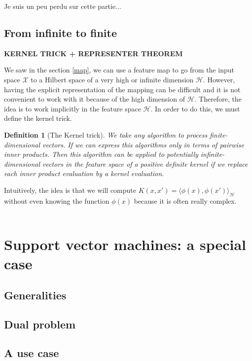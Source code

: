 \documentclass[a4paper, 11pt]{article}
\newtheorem{definition}{Definition}
\begin{document}
{\color{red} Je suis un peu perdu sur cette partie... }

\subsection{From infinite to finite}

{\bf \color{red} KERNEL TRICK + REPRESENTER THEOREM}

We saw in the section \ref{map}, we can use a feature map to go from the input space $\mathcal{X}$ to a Hilbert space of a very high or infinite dimension $\mathcal{H}$. However, having the explicit representation of the mapping can be difficult and it is not convenient to work with it because of the high dimension of $\mathcal{H}$. Therefore, the idea is to work implicitly in the feature space $\mathcal{H}$. In order to do this, we must define the kernel trick.

\begin{definition} [The Kernel trick]
We take any algorithm to process finite-dimensional vectors. If we can express this algorithms only in terms of pairwise inner products. Then this algorithm can be applied to potentially infinite-dimensional vectors in the feature space of a positive definite kernel if we replace each inner product evaluation by a kernel evaluation.
\end{definition}

Intuitively, the idea is that we will compute $K(x,x') = \langle\phi(x),\phi(x')\rangle_{\mathcal{H}}$ without even knowing the function $\phi(x)$ because it is often really complex.
\\\\


\section{Support vector machines: a special case}
\subsection{Generalities}
\subsection{Dual problem}
\subsection{A use case}
\end{document}
